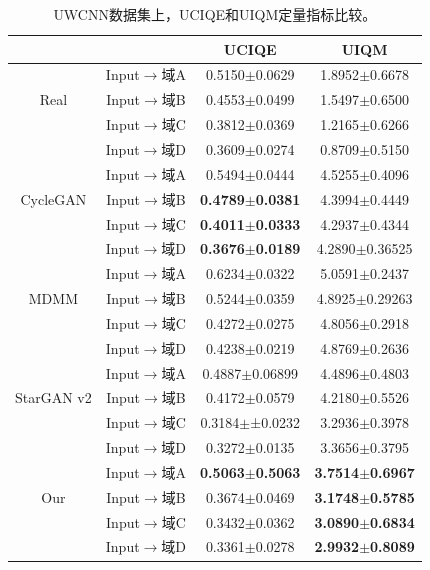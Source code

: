\begin{table}[htp]
  \centering
  \caption{UWCNN数据集上，UCIQE和UIQM定量指标比较。}
    \begin{tabular}{c|c|cc}
    \toprule
    \multicolumn{2}{c|}{} & \multicolumn{1}{c}{UCIQE} & UIQM \\
    \midrule
    \multirow{3}[2]{*}{Real} & Input$\rightarrow$域A & 0.5150$\pm$0.0629 & 1.8952$\pm$0.6678 \\
                             & Input$\rightarrow$域B & 0.4553$\pm$0.0499 & 1.5497$\pm$0.6500 \\
                             & Input$\rightarrow$域C & 0.3812$\pm$0.0369 & 1.2165$\pm$0.6266 \\
                             & Input$\rightarrow$域D & 0.3609$\pm$0.0274 & 0.8709$\pm$0.5150 \\
    \midrule
    \multirow{3}[2]{*}{CycleGAN} & Input$\rightarrow$域A & 0.5494$\pm$0.0444 & 4.5255$\pm$0.4096 \\
                                 & Input$\rightarrow$域B & \textbf{0.4789$\pm$0.0381} & 4.3994$\pm$0.4449 \\
                                 & Input$\rightarrow$域C & \textbf{0.4011$\pm$0.0333} & 4.2937$\pm$0.4344 \\
                                 & Input$\rightarrow$域D & \textbf{0.3676$\pm$0.0189} & 4.2890$\pm$0.36525 \\
    \midrule
    \multirow{3}[2]{*}{MDMM} & Input$\rightarrow$域A & 0.6234$\pm$0.0322 & 5.0591$\pm$0.2437 \\
          & Input$\rightarrow$域B & 0.5244$\pm$0.0359 & 4.8925$\pm$0.29263 \\
          & Input$\rightarrow$域C & 0.4272$\pm$0.0275 & 4.8056$\pm$0.2918 \\
          & Input$\rightarrow$域D & 0.4238$\pm$0.0219 & 4.8769$\pm$0.2636 \\
    \midrule
    \multirow{3}[2]{*}{StarGAN v2} &Input$\rightarrow$域A & 0.4887$\pm$0.06899 & 4.4896$\pm$0.4803 \\
          & Input$\rightarrow$域B & 0.4172$\pm$0.0579 & 4.2180$\pm$0.5526 \\
          & Input$\rightarrow$域C & 0.3184$\pm$±0.0232 & 3.2936$\pm$0.3978 \\
          & Input$\rightarrow$域D & 0.3272$\pm$0.0135 & 3.3656$\pm$0.3795 \\
    \midrule
    \multirow{3}[2]{*}{Our} & Input$\rightarrow$域A & \textbf{0.5063$\pm$0.5063} & \textbf{3.7514$\pm$0.6967} \\
          & Input$\rightarrow$域B & 0.3674$\pm$0.0469 & \textbf{3.1748$\pm$0.5785} \\
          & Input$\rightarrow$域C & 0.3432$\pm$0.0362 & \textbf{3.0890$\pm$0.6834} \\
          & Input$\rightarrow$域D & 0.3361$\pm$0.0278 & \textbf{2.9932$\pm$0.8089} \\
    \bottomrule
    \end{tabular}%
  \label{tab:underwater_matric_uwcnn}%
\end{table}%

